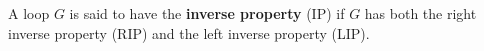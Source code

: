A loop $G$ is said to have the \textbf{inverse property} (IP) if $G$ has both the right inverse property (RIP) and the left inverse property (LIP).
